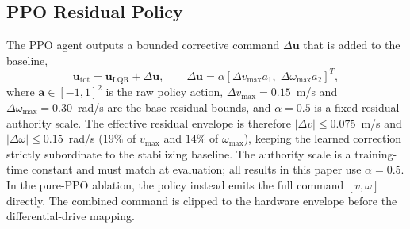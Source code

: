 \documentclass[conference]{IEEEtran}
\begin{document}
\subsection{PPO Residual Policy}
The PPO agent outputs a bounded corrective command $\Delta\mathbf{u}$ that is added to the baseline,
\begin{equation}
\mathbf{u}_{\text{tot}} = \mathbf{u}_{\text{LQR}} + \Delta\mathbf{u}, \qquad
\Delta\mathbf{u} = \alpha \left[\Delta v_{\max} a_1,\; \Delta\omega_{\max} a_2\right]^T,
\end{equation}
where $\mathbf{a}\in[-1,1]^2$ is the raw policy action, $\Delta v_{\max}=0.15$~m/s and $\Delta\omega_{\max}=0.30$~rad/s are the base residual bounds, and $\alpha=0.5$ is a fixed residual-authority scale. The effective residual envelope is therefore $|\Delta v| \le 0.075$~m/s and $|\Delta\omega| \le 0.15$~rad/s ($19\%$ of $v_{\max}$ and $14\%$ of $\omega_{\max}$), keeping the learned correction strictly subordinate to the stabilizing baseline. The authority scale is a training-time constant and must match at evaluation; all results in this paper use $\alpha=0.5$. In the pure-PPO ablation, the policy instead emits the full command $[v,\omega]$ directly. The combined command is clipped to the hardware envelope before the differential-drive mapping.
\end{document}
